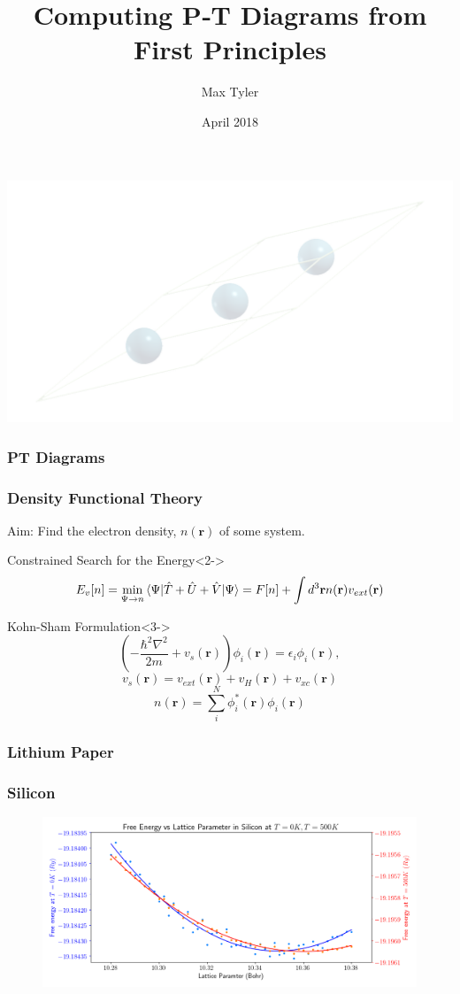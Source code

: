 \documentclass{beamer}
\title{Computing P‐T Diagrams from First Principles}
\author{Max Tyler}
\institute{The University of Edinburgh}
\date{April 2018}
\begin{document}
{ 
\usebackgroundtemplate
{
	\includegraphics[width=\paperwidth,height=\paperheight]{na9rlarge.png}
}
\frame{\titlepage}
}
 
\begin{frame}
	\frametitle{PT Diagrams}
\end{frame}

\begin{frame}
	\frametitle{Density Functional Theory}
	Aim: Find the electron density, $n(\mathbf r)$ of some system.
	\begin{block}{Constrained Search for the Energy}<2->
		$$E_{v}[n] = \min_{\Psi \rightarrow n} \braket{\Psi|\hat T+\hat U + \hat V|\Psi} = F[n] + \int d^3\mathbf r n(\mathbf r) v_{ext}(\mathbf r)$$
	\end{block}
	\begin{block}{Kohn-Sham Formulation}<3->
		$$\left(-\frac{\hbar^2\nabla^2}{2m}+v_s(\mathbf r)\right)\phi_i(\mathbf r) = \epsilon_i \phi_i(\mathbf r),$$
		$$v_s(\mathbf r) = v_{ext}(\mathbf r) + v_H(\mathbf r) + v_{xc}(\mathbf r)$$
		$$n(\mathbf r) = \sum_i^N\phi^*_i(\mathbf r)\phi_i(\mathbf r)$$	
	\end{block}
\end{frame}

\begin{frame}
	\frametitle{Lithium Paper}
\end{frame}
 
\begin{frame}
	\frametitle{Silicon}
	\begin{figure}[ht]
	\begin{center}
	\includegraphics[height=2in]{silicon_0_500_comparison.png}
	\end{center}
	\end{figure}
\end{frame}
\end{document}
